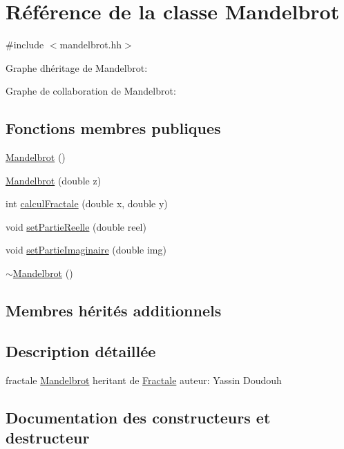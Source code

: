 \hypertarget{classMandelbrot}{}\section{Référence de la classe Mandelbrot}
\label{classMandelbrot}


{\ttfamily \#include $<$mandelbrot.\+hh$>$}



Graphe d\textquotesingle{}héritage de Mandelbrot\+:


Graphe de collaboration de Mandelbrot\+:
\subsection*{Fonctions membres publiques}
\begin{DoxyCompactItemize}
\item 
\hyperlink{classMandelbrot_aab7bca81a362bcbfabeae26c3e7fa562}{Mandelbrot} ()
\item 
\hyperlink{classMandelbrot_a9c02f4bdf09c40ae7ea17580d5a2a525}{Mandelbrot} (double z)
\item 
int \hyperlink{classMandelbrot_afc2cf40855f646200d54c263929d3eca}{calcul\+Fractale} (double x, double y)
\item 
void \hyperlink{classMandelbrot_a419baeb8628191ee44f3c82dd3281017}{set\+Partie\+Reelle} (double reel)
\item 
void \hyperlink{classMandelbrot_a9649677b1faeff917202845fd697dbe6}{set\+Partie\+Imaginaire} (double img)
\item 
\hyperlink{classMandelbrot_a4ffabf508467746a74459b53826504a0}{$\sim$\+Mandelbrot} ()
\end{DoxyCompactItemize}
\subsection*{Membres hérités additionnels}


\subsection{Description détaillée}
fractale \hyperlink{classMandelbrot}{Mandelbrot} heritant de \hyperlink{classFractale}{Fractale} auteur\+: Yassin Doudouh 

\subsection{Documentation des constructeurs et destructeur}
\mbox{\label{classMandelbrot_aab7bca81a362bcbfabeae26c3e7fa562}} 
